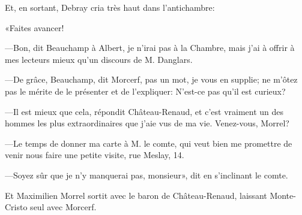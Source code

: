 Et, en sortant, Debray cria très haut dans l'antichambre: 

«Faites avancer! 

—Bon, dit Beauchamp à Albert, je n'irai pas à la Chambre, mais j'ai à offrir à mes lecteurs mieux qu'un discours de M. Danglars. 

—De grâce, Beauchamp, dit Morcerf, pas un mot, je vous en supplie; ne m'ôtez pas le mérite de le présenter et de l'expliquer: N'est-ce pas qu'il est curieux? 

—Il est mieux que cela, répondit Château-Renaud, et c'est vraiment un des hommes les plus extraordinaires que j'aie vus de ma vie. Venez-vous, Morrel? 

—Le temps de donner ma carte à M. le comte, qui veut bien me promettre de venir nous faire une petite visite, rue Meslay, 14. 

—Soyez sûr que je n'y manquerai pas, monsieur», dit en s'inclinant le comte. 

Et Maximilien Morrel sortit avec le baron de Château-Renaud, laissant Monte-Cristo seul avec Morcerf. 